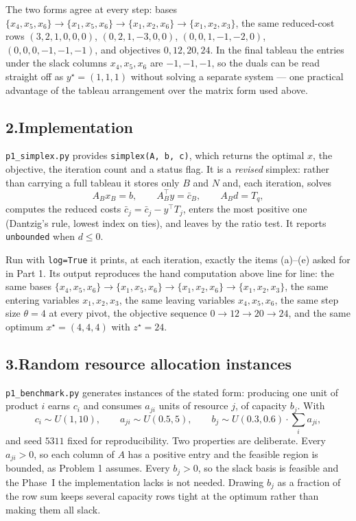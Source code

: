\documentclass[11pt]{article}
\theoremstyle{definition}
\theoremstyle{plain}
\begin{document}
The two forms agree at every step: bases
$\{x_4,x_5,x_6\} \to \{x_1,x_5,x_6\} \to \{x_1,x_2,x_6\} \to
\{x_1,x_2,x_3\}$, the same reduced-cost rows
$(3,2,1,0,0,0)$, $(0,2,1,-3,0,0)$, $(0,0,1,-1,-2,0)$,
$(0,0,0,-1,-1,-1)$, and objectives $0, 12, 20, 24$. In the final
tableau the entries under the slack columns $x_4, x_5, x_6$ are
$-1, -1, -1$, so the duals can be read straight off as
$y^\star = (1,1,1)$ without solving a separate system --- one practical
advantage of the tableau arrangement over the matrix form used above.

\subsection*{2.\quad Implementation}

\texttt{p1\_simplex.py} provides
\texttt{simplex(A, b, c)}, which returns the optimal $x$, the objective,
the iteration count and a status flag. It is a \emph{revised} simplex:
rather than carrying a full tableau it stores only $B$ and $N$ and, each
iteration, solves
\[
  A_B x_B = b, \qquad A_B^{\!\top} y = \bar{c}_B,
  \qquad A_B d = T_q ,
\]
computes the reduced costs $\bar{c}_j = \bar{c}_j - y^{\!\top}T_j$,
enters the most positive one (Dantzig's rule, lowest index on ties), and
leaves by the ratio test. It reports \texttt{unbounded} when
$d \le 0$.

Run with \texttt{log=True} it prints, at each iteration, exactly the
items (a)--(e) asked for in Part 1. Its output reproduces the hand
computation above line for line: the same bases
$\{x_4,x_5,x_6\} \to \{x_1,x_5,x_6\} \to \{x_1,x_2,x_6\} \to
\{x_1,x_2,x_3\}$, the same entering variables $x_1, x_2, x_3$, the same
leaving variables $x_4, x_5, x_6$, the same step size $\theta = 4$ at
every pivot, the objective sequence $0 \to 12 \to 20 \to 24$, and the
same optimum $x^\star = (4,4,4)$ with $z^\star = 24$.

\subsection*{3.\quad Random resource allocation instances}

\texttt{p1\_benchmark.py} generates instances of the stated form:
producing one unit of product $i$ earns $c_i$ and consumes $a_{ji}$
units of resource $j$, of capacity $b_j$. With
\[
  c_i \sim U(1, 10), \qquad
  a_{ji} \sim U(0.5, 5), \qquad
  b_j \sim U(0.3, 0.6) \cdot \sum_{i} a_{ji},
\]
and seed $5311$ fixed for reproducibility. Two properties are
deliberate. Every $a_{ji} > 0$, so each column of $A$ has a positive
entry and the feasible region is bounded, as Problem 1 assumes. Every
$b_j > 0$, so the slack basis is feasible and the Phase~I the
implementation lacks is not needed. Drawing $b_j$ as a fraction of the
row sum keeps several capacity rows tight at the optimum rather than
making them all slack.
\end{document}
